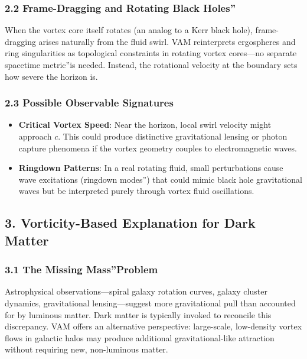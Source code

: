 \documentclass[a4paper,12pt]{article}
\begin{document}
\subsubsection*{2.2 Frame-Dragging and Rotating \grqq Black Holes\textquotedblright}
When the vortex core itself rotates (an analog to a Kerr black hole), frame-dragging arises naturally from the fluid swirl. VAM reinterprets ergospheres and ring singularities as topological constraints in rotating vortex cores—no separate \grqq spacetime metric\textquotedblright is needed. Instead, the rotational velocity at the boundary sets how severe the horizon is.

\subsubsection*{2.3 Possible Observable Signatures}
\begin{itemize}
    \item \textbf{Critical Vortex Speed}: Near the horizon, local swirl velocity might approach \(c\). This could produce distinctive gravitational lensing or photon capture phenomena if the vortex geometry couples to electromagnetic waves.
    \item \textbf{Ringdown Patterns}: In a real rotating fluid, small perturbations cause wave excitations (\grqq ringdown modes\textquotedblright) that could mimic black hole gravitational waves but be interpreted purely through vortex fluid oscillations.
\end{itemize}

\subsection*{3. Vorticity-Based Explanation for Dark Matter}

\subsubsection*{3.1 The \grqq Missing Mass\textquotedblright Problem}
Astrophysical observations—spiral galaxy rotation curves, galaxy cluster dynamics, gravitational lensing—suggest more gravitational pull than accounted for by luminous matter. Dark matter is typically invoked to reconcile this discrepancy. VAM offers an alternative perspective: large-scale, low-density vortex flows in galactic halos may produce additional gravitational-like attraction without requiring new, non-luminous matter.
\end{document}
